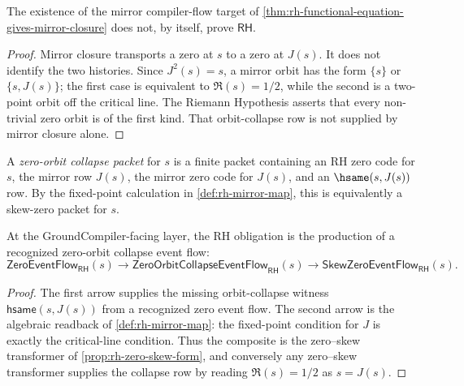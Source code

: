 \begin{corollary}
\label{cor:rh-mirror-closure-weaker-than-rh}
The existence of the mirror compiler-flow target of
\autoref{thm:rh-functional-equation-gives-mirror-closure} does not, by itself,
prove $\mathsf{RH}$.
\end{corollary}

\begin{proof}
Mirror closure transports a zero at $s$ to a zero at $J(s)$.  It does not
identify the two histories.  Since $J^2(s)=s$, a mirror orbit has the form
$\{s\}$ or $\{s,J(s)\}$; the first case is equivalent to
$\Re(s)=1/2$, while the second is a two-point orbit off the critical line.
The Riemann Hypothesis asserts that every non-trivial zero orbit is of the
first kind.  That orbit-collapse row is not supplied by mirror closure alone.
\end{proof}

\begin{definition}
\label{def:rh-zero-orbit-collapse-packet}
A \emph{zero-orbit collapse packet} for $s$ is a finite packet containing an
RH zero code for $s$, the mirror row $J(s)$, the mirror zero code for $J(s)$,
and an $\hsame(s,J(s))$ row.  By the fixed-point calculation in
\autoref{def:rh-mirror-map}, this is equivalently a skew-zero packet for $s$.
\end{definition}

\begin{corollary}
\label{cor:rh-groundcompiler-normal-form}
At the GroundCompiler-facing layer, the RH obligation is the production of a
recognized zero-orbit collapse event flow:
$$
\mathsf{ZeroEventFlow}_{\mathsf{RH}}(s)
\to
\mathsf{ZeroOrbitCollapseEventFlow}_{\mathsf{RH}}(s)
\to
\mathsf{SkewZeroEventFlow}_{\mathsf{RH}}(s).
$$
\end{corollary}

\begin{proof}
The first arrow supplies the missing orbit-collapse witness
$\mathsf{hsame}(s,J(s))$ from a recognized zero event flow.  The second arrow
is the algebraic readback of \autoref{def:rh-mirror-map}: the fixed-point
condition for $J$ is exactly the critical-line condition.  Thus the composite
is the zero--skew transformer of \autoref{prop:rh-zero-skew-form}, and
conversely any zero--skew transformer supplies the collapse row by reading
$\Re(s)=1/2$ as $s=J(s)$.
\end{proof}

